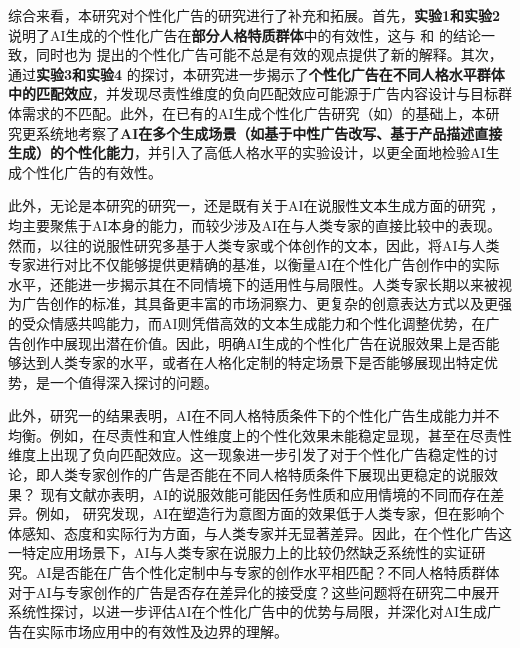 综合来看，本研究对个性化广告的研究进行了补充和拓展。首先，\textbf{实验1和实验2} 说明了AI生成的个性化广告在\textbf{部分人格特质群体}中的有效性，这与\citet{hirsh2012personalized} 和\citet{matz2017psychological} 的结论一致，同时也为\citet{winter2021effects} 提出的个性化广告可能不总是有效的观点提供了新的解释。其次，通过\textbf{实验3和实验4} 的探讨，本研究进一步揭示了\textbf{个性化广告在不同人格水平群体中的匹配效应}，并发现尽责性维度的负向匹配效应可能源于广告内容设计与目标群体需求的不匹配。此外，在已有的AI生成个性化广告研究（如\citet{matz2024potential}）的基础上，本研究更系统地考察了\textbf{AI在多个生成场景（如基于中性广告改写、基于产品描述直接生成）的个性化能力}，并引入了高低人格水平的实验设计，以更全面地检验AI生成个性化广告的有效性。

此外，无论是本研究的研究一，还是既有关于AI在说服性文本生成方面的研究 \citep[如][]{bai2023artificial,goldstein2024persuasive}，均主要聚焦于AI本身的能力，而较少涉及AI在与人类专家的直接比较中的表现。然而，以往的说服性研究多基于人类专家或个体创作的文本，因此，将AI与人类专家进行对比不仅能够提供更精确的基准，以衡量AI在个性化广告创作中的实际水平，还能进一步揭示其在不同情境下的适用性与局限性。人类专家长期以来被视为广告创作的标准，其具备更丰富的市场洞察力、更复杂的创意表达方式以及更强的受众情感共鸣能力，而AI则凭借高效的文本生成能力和个性化调整优势，在广告创作中展现出潜在价值。因此，明确AI生成的个性化广告在说服效果上是否能够达到人类专家的水平，或者在人格化定制的特定场景下是否能够展现出特定优势，是一个值得深入探讨的问题。

此外，研究一的结果表明，AI在不同人格特质条件下的个性化广告生成能力并不均衡。例如，在尽责性和宜人性维度上的个性化效果未能稳定显现，甚至在尽责性维度上出现了负向匹配效应。这一现象进一步引发了对于个性化广告稳定性的讨论，即人类专家创作的广告是否能在不同人格特质条件下展现出更稳定的说服效果？ 现有文献亦表明，AI的说服效能可能因任务性质和应用情境的不同而存在差异。例如，\citet{huang2023artificial} 研究发现，AI在塑造行为意图方面的效果低于人类专家，但在影响个体感知、态度和实际行为方面，与人类专家并无显著差异。因此，在个性化广告这一特定应用场景下，AI与人类专家在说服力上的比较仍然缺乏系统性的实证研究。AI是否能在广告个性化定制中与专家的创作水平相匹配？不同人格特质群体对于AI与专家创作的广告是否存在差异化的接受度？这些问题将在研究二中展开系统性探讨，以进一步评估AI在个性化广告中的优势与局限，并深化对AI生成广告在实际市场应用中的有效性及边界的理解。